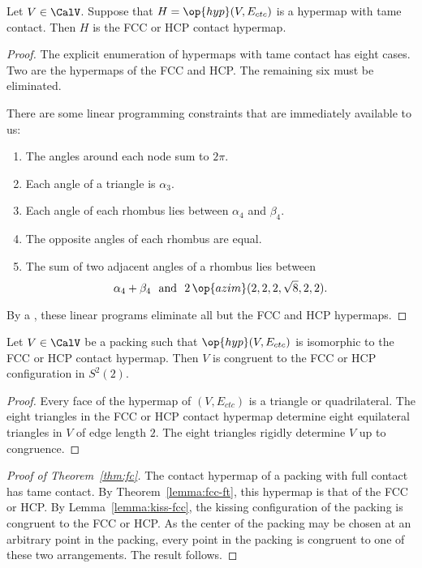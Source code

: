 \begin{lemma}[]\label{lemma:fcc-ft} Let $V\in \CalV$.
  Suppose that $H=\op{hyp}(V,E_{ctc})$ is a hypermap with tame
  contact.  Then $H$ is the FCC or HCP contact hypermap.
\end{lemma}

\begin{proof} The explicit enumeration of hypermaps with tame
  contact has eight cases.  Two are the hypermaps of the
  FCC and HCP.  The remaining six must be eliminated.

There are some linear
  programming constraints that are immediately available to us:
\begin{enumerate}\wasitemize 
\item The angles around each node sum to $2\pi$.
\item Each angle of a triangle is $\alpha_3$.
\item Each angle of each rhombus lies between $\alpha_4$ and $\beta_4$.
\item The opposite angles of each rhombus are equal.
\item The sum of two adjacent angles of a rhombus lies between
\[
  \alpha_4 + \beta_4 \text{~~and~~} 2\,\op{azim}(2,2,2,\sqrt8,2,2).
\]
\end{enumerate}\wasitemize 
By a ,
these linear programs eliminate all but the FCC and HCP hypermaps.
\end{proof}


\begin{lemma}[]\label{lemma:kiss-fcc}
  Let $V\in \CalV$ be a packing such that $\op{hyp}(V,E_{ctc})$ is
  isomorphic to the FCC or HCP contact hypermap.  Then $V$ is
  congruent to the FCC or HCP configuration in $S^2(2)$.
\end{lemma}
%
%
%
%
%

\begin{proof} Every face of the hypermap of $(V,E_{ctc})$ is a
  triangle or quadrilateral.  The eight triangles in the FCC or HCP
  contact hypermap determine eight equilateral triangles in $V$ of
  edge length $2$.  The eight triangles rigidly determine $V$ up to
  congruence.
\end{proof}

\begin{proof}[Proof of Theorem~\ref{thm:fc}]  %
  The contact hypermap of a packing with full contact has tame
  contact.  By Theorem~\ref{lemma:fcc-ft}, this hypermap is that of
  the FCC or HCP.  By Lemma~\ref{lemma:kiss-fcc}, the kissing
  configuration of the packing is congruent to the FCC or HCP.  As the
  center of the packing may be chosen at an arbitrary point in the
  packing, every point in the packing is congruent to one of these two
  arrangements.  The result follows.
\end{proof}



